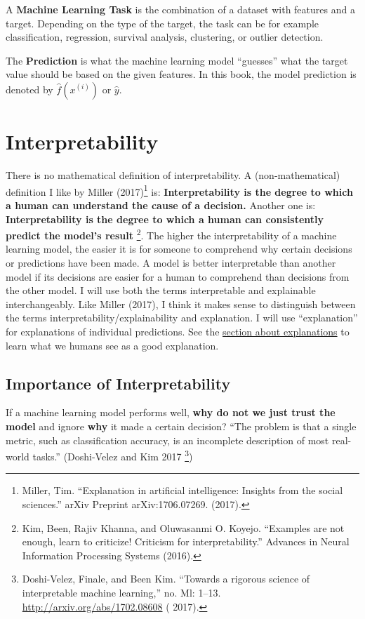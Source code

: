 \documentclass[
  12pt,
]{krantz}
\begin{document}
A \textbf{Machine Learning Task} is the combination of a dataset with features and a target.
Depending on the type of the target, the task can be for example classification, regression, survival analysis, clustering, or outlier detection.

The \textbf{Prediction} is what the machine learning model ``guesses'' what the target value should be based on the given features.
In this book, the model prediction is denoted by \(\hat{f}(x^{(i)})\) or \(\hat{y}\).

\hypertarget{interpretability}{%
\chapter{Interpretability}\label{interpretability}}

There is no mathematical definition of interpretability.
A (non-mathematical) definition I like by Miller (2017)\footnote{Miller, Tim. ``Explanation in artificial intelligence: Insights from the social sciences.'' arXiv Preprint arXiv:1706.07269. (2017).} is:
\textbf{Interpretability is the degree to which a human can understand the cause of a decision.}
Another one is:
\textbf{Interpretability is the degree to which a human can consistently predict the model's result} \footnote{Kim, Been, Rajiv Khanna, and Oluwasanmi O. Koyejo. ``Examples are not enough, learn to criticize! Criticism for interpretability.'' Advances in Neural Information Processing Systems (2016).}.
The higher the interpretability of a machine learning model, the easier it is for someone to comprehend why certain decisions or predictions have been made.
A model is better interpretable than another model if its decisions are easier for a human to comprehend than decisions from the other model.
I will use both the terms interpretable and explainable interchangeably.
Like Miller (2017), I think it makes sense to distinguish between the terms interpretability/explainability and explanation.
I will use ``explanation'' for explanations of individual predictions.
See the \protect\hyperlink{explanation}{section about explanations} to learn what we humans see as a good explanation.

\hypertarget{interpretability-importance}{%
\section{Importance of Interpretability}\label{interpretability-importance}}

If a machine learning model performs well, \textbf{why do not we just trust the model} and ignore \textbf{why} it made a certain decision?
``The problem is that a single metric, such as classification accuracy, is an incomplete description of most real-world tasks.'' (Doshi-Velez and Kim 2017 \footnote{Doshi-Velez, Finale, and Been Kim. ``Towards a rigorous science of interpretable machine learning,'' no. Ml: 1--13. \url{http://arxiv.org/abs/1702.08608} ( 2017).})
\end{document}
